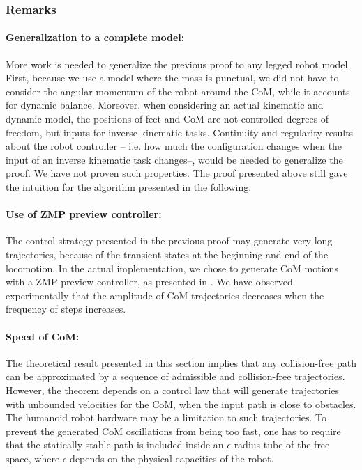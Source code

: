 \documentclass{article}
\begin{document}
\subsubsection{Remarks}
\paragraph{Generalization to a complete model:} More work is needed to generalize 
the previous proof to any legged robot model. First, because we use a model where
the mass is punctual, we did not have to consider the angular-momentum of the robot
around the CoM, while it accounts for dynamic balance. Moreover, when considering
an actual kinematic and dynamic model,
the positions of feet and CoM are not controlled degrees of freedom, but inputs 
for inverse kinematic tasks. Continuity and regularity results about the robot
controller -- i.e. how much the configuration changes when the input of an inverse
kinematic task changes--, would be needed to generalize the proof. We have not
proven such properties. The  proof presented above still gave the intuition for the
algorithm presented in the following.


\paragraph{Use of ZMP preview controller:} The control strategy presented in the  
previous proof may
generate very  long trajectories, because  of the transient  states at
the beginning and end of the locomotion. In the actual implementation,
we chose  to generate  CoM motions with  a ZMP preview  controller, as
presented in \cite{kajita2003biped}.  We  have observed experimentally that the
amplitude of  CoM trajectories decreases  when the frequency  of steps
increases.

\paragraph{Speed of CoM:} The theoretical result presented in this section implies
that any collision-free path can be approximated by a sequence of admissible 
and collision-free trajectories. However, the theorem depends on a control law
that will generate trajectories with unbounded velocities for the CoM, when the input
path is close to obstacles. The humanoid robot
hardware may be a limitation to such trajectories. To prevent the generated CoM 
oscillations from being too fast, one has to require that the statically stable 
path is included
inside an $\epsilon$-radius tube of the free space, where $\epsilon$ depends on the
physical capacities of the robot.
\end{document}
